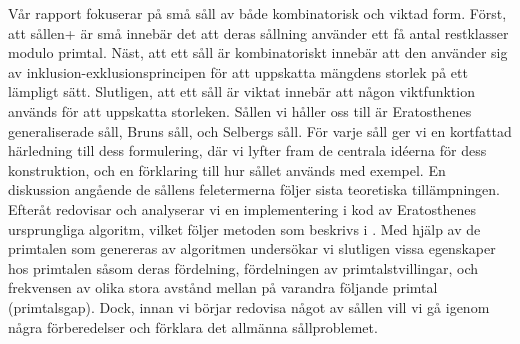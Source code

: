 Vår rapport fokuserar på små såll av både kombinatorisk och viktad form. 
Först, att sållen+ är små innebär det att deras sållning använder ett få antal restklasser modulo primtal.
 Näst, att ett såll är kombinatoriskt innebär att den använder sig av inklusion-exklusionsprincipen för att uppskatta mängdens storlek på ett lämpligt sätt. 
Slutligen, att ett såll är viktat innebär att någon viktfunktion används för att uppskatta storleken. 
Sållen vi håller oss till är Eratosthenes generaliserade såll, Bruns såll, och Selbergs såll. 
För varje såll ger vi en kortfattad härledning till dess formulering, där vi lyfter fram de centrala idéerna för dess konstruktion, och en förklaring till hur sållet används med exempel.
En diskussion angående de sållens feletermerna följer sista teoretiska tillämpningen.
Efteråt redovisar och analyserar vi en implementering i kod av Eratosthenes ursprungliga algoritm, vilket följer metoden som beskrivs i \cite{HaraldSieve}.
Med hjälp av de primtalen som genereras av algoritmen undersökar vi slutligen vissa egenskaper hos primtalen såsom deras fördelning, fördelningen av primtalstvillingar, och frekvensen av olika stora avstånd mellan på varandra följande primtal (primtalsgap).
Dock, innan vi börjar redovisa något av sållen vill vi gå igenom några förberedelser och förklara det allmänna sållproblemet.